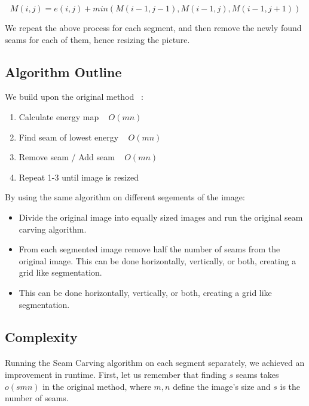 \documentclass[conference]{acmsiggraph}
\begin{document}
\begin{equation}
M(i,j) = e(i,j) + min( M(i-1,j-1), M(i-1,j), M(i-1,j+1) )
\end{equation}

We repeat the above process for each segment, and then remove the newly found seams for each of them, hence resizing the picture.

\subsection{Algorithm Outline}

We build upon the original method ~\cite{Avidan2007}:
\begin{enumerate}
  \item Calculate energy map ~ $O(m n)$
  \item Find seam of lowest energy ~ $O(m n)$
  \item Remove seam / Add seam ~ $O(m n)$
  \item Repeat 1-3 until image is resized
\end{enumerate}

By using the same algorithm on different segements of the image:

\begin{itemize}
  \item Divide the original image into equally sized images and run the original seam carving algorithm.
  \item From each segmented image remove half the number of seams from the original image. This can be done horizontally, vertically, or both, creating a grid like segmentation.
  \item This can be done horizontally, vertically, or both, creating a grid like segmentation.
\end{itemize}




\subsection{Complexity}

\paragraph{}
Running the Seam Carving algorithm on each segment separately, we achieved an improvement in runtime. First, let us remember that finding $s$ seams takes $o(s m n)$ in the original method, where $m,n$ define the image's size and $s$ is the number of seams.
\end{document}
